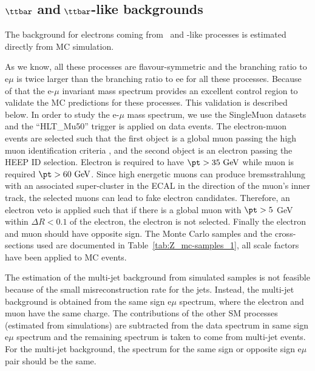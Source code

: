 
\subsection{\texorpdfstring{$\ttbar$}{h1} and\texorpdfstring{$~\ttbar$}{h2}-like backgrounds}
\label{Sec:emuSS}

The background for electrons coming from \ttbar\ and \ttbar-like processes is estimated directly from MC simulation.

As we know, all these processes are flavour-symmetric and the branching ratio to e$\mu$ is twice larger than the branching ratio to ee for all these processes. Because of that the e-$\mu$ invariant mass spectrum provides an excellent control region to validate the MC predictions for these processes. This validation is described below.
In order to study the e-$\mu$ mass spectrum, we use the SingleMuon datasets and the ``HLT\_Mu50'' trigger is applied on data events.
The electron-muon events are selected such that the first object is a global muon passing the high \pt muon identification criteria \cite{CMS-AN-2016-391},
and the second object is an electron passing the HEEP ID selection. Electron is required to have $\pt>35~\mathrm{GeV}$ while muon is required $\pt>60~\mathrm{GeV}$.
Since high energetic muons can produce bremsstrahlung with an associated super-cluster in the ECAL in the direction of the muon's
inner track, the selected muons can lead to fake electron candidates. Therefore, an electron veto is applied such that if there is
a global muon with $\pt > 5$ GeV within $\Delta R <0.1$ of the electron, the electron is not selected. Finally the electron and muon should have opposite sign.
The Monte Carlo samples and the cross-sections used are documented in Table~\ref{tab:Z_mc-samples_1}, all scale factors have been applied to MC events.

The estimation of the multi-jet background from simulated samples is not feasible because of the small misreconstruction rate for the jets.
Instead, the multi-jet background is obtained from the same sign e$\mu$ spectrum, where the electron and muon have the same charge.
The contributions of the other SM processes (estimated from simulations) are subtracted from the data
spectrum in same sign e$\mu$ spectrum and the remaining spectrum is taken to come from multi-jet events. For the multi-jet background, the spectrum for the same sign or opposite sign e$\mu$ pair should be the same.


